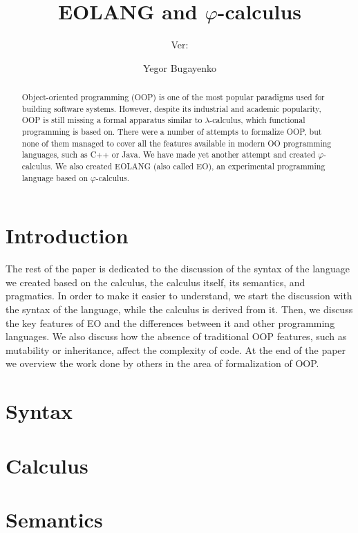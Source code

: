 \documentclass[sigplan,nonacm,natbib=false]{acmart}
\title{EOLANG and \texorpdfstring{$\varphi$}{phi}-calculus}
\subtitle{%
  Ver:
  \texorpdfstring{
    \href{https://github.com/REPOSITORY/releases/tag/0.0.0}
      {\ff{0.0.0}}
  }{0.0.0}
}
\author{Yegor Bugayenko}
\affiliation{
  \institution{Huawei}
  \city{Moscow}
  \country{Russia}
}
\theoremstyle{theorems}
\newcommand\phic{$\varphi$-calculus}
\newcommand\eo{{\sffamily EO}}
\begin{document}
\begin{abstract}
Object-oriented programming (OOP) is one of the most popular
paradigms used for building software systems. However, despite
its industrial and academic popularity, OOP is still missing
a formal apparatus similar to $\lambda$-calculus, which functional
programming is based on. There were a number of attempts to formalize
OOP, but none of them managed to cover all the features available in
modern OO programming languages, such as C++ or Java.
We have made yet another attempt and created \phic{}. We also
created EOLANG (also called \eo{}), an experimental
programming language based on \phic{}.
\end{abstract}

\maketitle

\section{Introduction}
\label{sec:intro}



The rest of the paper is dedicated to the discussion of the
syntax of the language we created based on the calculus,
the calculus itself, its semantics, and pragmatics.
In order to make it easier to understand, we start
the discussion with the syntax of the language, while the calculus
is derived from it. Then, we discuss the
key features of \eo{} and the differences between it and other
programming languages. We also discuss how the absence of traditional
OOP features, such as mutability or inheritance, affect the complexity of code.
At the end of the paper we overview the work done by others in the area of
formalization of OOP.

\section{Syntax}
\label{sec:syntax}


\section{Calculus}
\label{sec:calculus}


\section{Semantics}
\label{sec:semantics}

\end{document}
